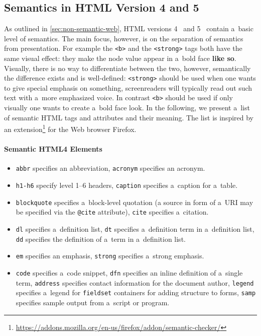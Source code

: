 \subsection{Semantics in HTML Version 4 and 5}
As outlined in \autoref{sec:non-semantic-web}, HTML versions 4~\cite{LeHors1999} and 5~\cite{Hickson2011}
contain a~basic level of semantics.
The main focus, however, is on the separation of semantics from presentation.
For example the \texttt{<b>} and the \texttt{<strong>} tags both have the same visual effect:
they make the node value appear in a~bold face \textbf{like so}.
Visually, there is no way to differentiate between the two, however,
semantically the difference exists and is well-defined:
\texttt{<strong>} should be used when one wants to give special emphasis on something,
screenreaders will typically read out such text with a~more emphasized voice.
In contrast \texttt{<b>} should be used if only visually one wants to create a~bold face look.
In the following, we present a~list of semantic HTML tags and attributes and their meaning.
The list is inspired by an
extension\footnote{\url{https://addons.mozilla.org/en-us/firefox/addon/semantic-checker/}}
for the Web browser Firefox.

\paragraph{Semantic HTML4 Elements}
\begin{itemize}
\item \texttt{abbr} specifies an abbreviation, \texttt{acronym} specifies an acronym.
\item \texttt{h1-h6} specify level 1–6 headers, \texttt{caption} specifies a~caption for a~table.
\item \texttt{blockquote} specifies a~block-level quotation
(a source in form of a~URI may be specified via the \texttt{@cite} attribute),
\texttt{cite} specifies a~citation.
\item \texttt{dl} specifies a~definition list, \texttt{dt} specifies a~definition term in a~definition list,
\texttt{dd} specifies the definition of a~term in a~definition list.
\item \texttt{em} specifies an emphasis, \texttt{strong} specifies a~strong emphasis.
\item \texttt{code} specifies a~code snippet, \texttt{dfn} specifies an inline definition of a~single term,
\texttt{address} specifies contact information for the document author,
\texttt{legend} specifies a~legend for \texttt{fieldset} containers for adding structure to forms,
\texttt{samp} specifies sample output from a~script or program.
\end{itemize}

